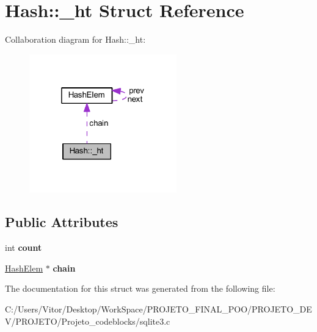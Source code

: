 \hypertarget{struct_hash_1_1__ht}{\section{Hash\-:\-:\-\_\-ht Struct Reference}
\label{struct_hash_1_1__ht}
}


Collaboration diagram for Hash\-:\-:\-\_\-ht\-:\nopagebreak
\begin{figure}[H]
\begin{center}
\leavevmode
\includegraphics[width=181pt]{struct_hash_1_1__ht__coll__graph}
\end{center}
\end{figure}
\subsection*{Public Attributes}
\begin{DoxyCompactItemize}
\item 
\hypertarget{struct_hash_1_1__ht_a0677191178b6c7c5c6c2880f41cf24b1}{int {\bfseries count}}\label{struct_hash_1_1__ht_a0677191178b6c7c5c6c2880f41cf24b1}

\item 
\hypertarget{struct_hash_1_1__ht_a56fc145e7d38d9440d85ab2ea63a48ac}{\hyperlink{struct_hash_elem}{Hash\-Elem} $\ast$ {\bfseries chain}}\label{struct_hash_1_1__ht_a56fc145e7d38d9440d85ab2ea63a48ac}

\end{DoxyCompactItemize}


The documentation for this struct was generated from the following file\-:\begin{DoxyCompactItemize}
\item 
C\-:/\-Users/\-Vitor/\-Desktop/\-Work\-Space/\-P\-R\-O\-J\-E\-T\-O\-\_\-\-F\-I\-N\-A\-L\-\_\-\-P\-O\-O/\-P\-R\-O\-J\-E\-T\-O\-\_\-\-D\-E\-V/\-P\-R\-O\-J\-E\-T\-O/\-Projeto\-\_\-codeblocks/sqlite3.\-c\end{DoxyCompactItemize}
